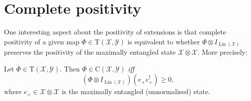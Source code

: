 \documentclass[12pt]{report}
\newcommand{\calY}{{\mathcal{Y}}}
\newcommand{\calX}{{\mathcal{X}}}
\newcommand{\rmC}{{\mathrm{C}}}
\newcommand{\rmT}{{\mathrm{T}}}
\DeclareMathOperator{\Lin}{Lin}
\begin{document}
\section{Complete positivity}

One interesting aspect about the positivity of extensions is that complete positivity of a given map $\Phi\in\rmT(\calX,\calY)$ is equivalent to whether $\Phi\otimes I_{\Lin(\calX)}$ preserves the positivity of the maximally entangled state $\calX\otimes\calX$. More precisely:
\begin{prop}
	Let $\Phi\in\rmT(\calX,\calY)$. Then $\Phi\in\rmC(\calX,\calY)$ \emph{iff}
	\begin{equation}
		(\Phi\otimes I_{\Lin(\calX)})(e_+ e_+^\dagger)\ge0,
	\end{equation}
	where $e_+\in\calX\otimes\calX$ is the maximally entangled (unnormalised) state.
\end{prop}
\end{document}
